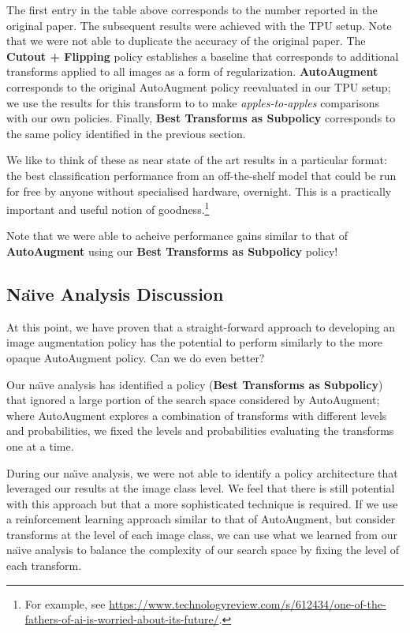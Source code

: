 \documentclass[10pt,twocolumn,letterpaper]{article}
\begin{document}
    The first entry in the table above corresponds to the number reported in the original paper. The subsequent results were achieved with the TPU setup. Note that we were not able to duplicate the accuracy of the original paper. The \textbf{Cutout + Flipping} policy establishes a baseline that corresponds to additional transforms applied to all images as a form of regularization. \textbf{AutoAugment} corresponds to the original AutoAugment policy reevaluated in our TPU setup; we use the results for this transform to to make \textit{apples-to-apples} comparisons with our own policies. Finally, \textbf{Best Transforms as Subpolicy} corresponds to the same policy identified in the previous section. 

    We like to think of these as near state of the art results in a particular format: the best classification performance from an off-the-shelf model that could be run for free by anyone without specialised hardware, overnight. This is a practically important and useful notion of goodness.\footnote{For example, see \url{https://www.technologyreview.com/s/612434/one-of-the-fathers-of-ai-is-worried-about-its-future/}.}

    Note that we were able to acheive performance gains similar to that of \textbf{AutoAugment} using our \textbf{Best Transforms as Subpolicy} policy!

  \subsection{Na\"{\i}ve Analysis Discussion}
    		
    At this point, we have proven that a straight-forward approach to developing an image augmentation policy has the potential to perform similarly to the more opaque AutoAugment policy. Can we do even better?
    
    Our na\"{\i}ve analysis has identified a policy (\textbf{Best Transforms as Subpolicy}) that ignored a large portion of the search space considered by AutoAugment; where AutoAugment explores a combination of transforms with different levels and probabilities, we fixed the levels and probabilities evaluating the transforms one at a time.
    
    During our na\"{\i}ve analysis, we were not able to identify a policy architecture that leveraged our results at the image class level. We feel that there is still potential with this approach but that a more sophisticated technique is required. If we use a reinforcement learning approach similar to that of AutoAugment, but consider transforms at the level of each image class, we can use what we learned from our na\"{\i}ve analysis to balance the complexity of our search space by fixing the level of each transform.
    
\end{document}
